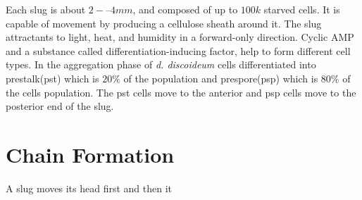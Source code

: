 \documentclass[11pt,a4paper]{article}
\begin{document}
Each slug is about $2-–4 mm$, and composed of up to $100k$ starved cells. It is capable of movement by producing a cellulose sheath around it. The slug attractants to light, heat, and humidity in a forward-only direction. Cyclic AMP and a substance called differentiation-inducing factor, help to form different cell types. In the aggregation phase of \textit{d. discoideum} cells differentiated into prestalk(pst) which is $20\%$ of the population and prespore(psp) which is $80\%$ of the cells population. The pst cells move to the anterior and psp cells move to the posterior end of the slug.

\section{Chain Formation}
A slug moves its head first and then it







 
 


 
\end{document}
